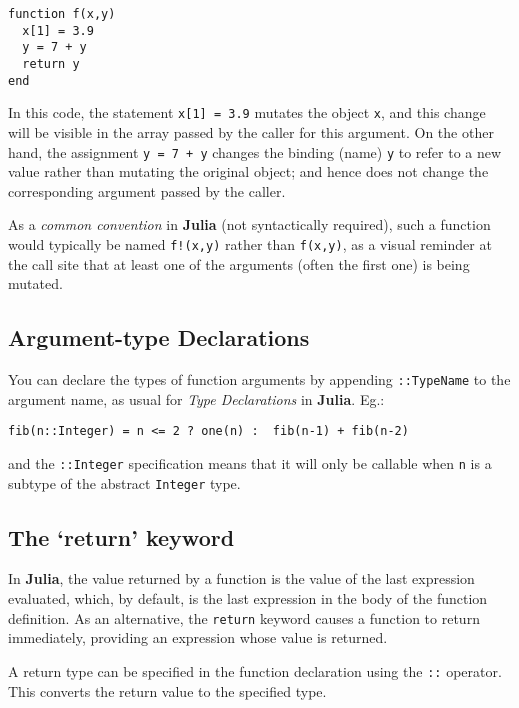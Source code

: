 \documentclass[
]{article}
\begin{document}
\begin{verbatim}
function f(x,y)
  x[1] = 3.9
  y = 7 + y
  return y
end
\end{verbatim}

In this code, the statement \texttt{x{[}1{]}\ =\ 3.9} mutates the object
\texttt{x}, and this change will be visible in the array passed by the
caller for this argument. On the other hand, the assignment
\texttt{y\ =\ 7\ +\ y} changes the binding (name) \texttt{y} to refer to
a new value rather than mutating the original object; and hence does not
change the corresponding argument passed by the caller.

As a \emph{common convention} in \textbf{Julia} (not syntactically
required), such a function would typically be named \texttt{f!(x,y)}
rather than \texttt{f(x,y)}, as a visual reminder at the call site that
at least one of the arguments (often the first one) is being mutated.

\hypertarget{argument-type-declarations}{%
\subsection{Argument-type
Declarations}\label{argument-type-declarations}}

You can declare the types of function arguments by appending
\texttt{::TypeName} to the argument name, as usual for \emph{Type
Declarations} in \textbf{Julia}. Eg.:

\begin{verbatim}
fib(n::Integer) = n <= 2 ? one(n) :  fib(n-1) + fib(n-2)
\end{verbatim}

and the \texttt{::Integer} specification means that it will only be
callable when \texttt{n} is a subtype of the abstract \texttt{Integer}
type.

\hypertarget{the-return-keyword}{%
\subsection{The `return' keyword}\label{the-return-keyword}}

In \textbf{Julia}, the value returned by a function is the value of the
last expression evaluated, which, by default, is the last expression in
the body of the function definition. As an alternative, the
\texttt{return} keyword causes a function to return immediately,
providing an expression whose value is returned.

A return type can be specified in the function declaration using the
\texttt{::} operator. This converts the return value to the specified
type.
\end{document}
